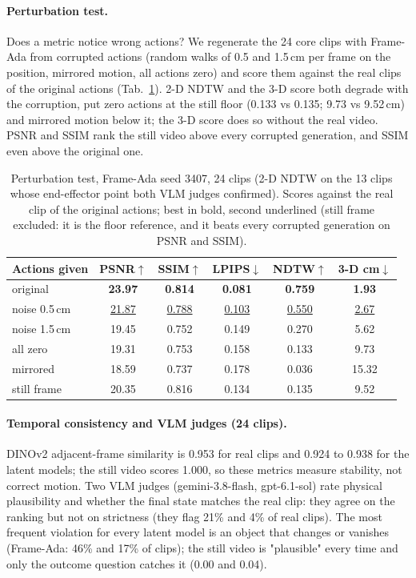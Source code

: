 \paragraph{Perturbation test.}
Does a metric notice wrong actions? We regenerate the 24 core clips with Frame-Ada from corrupted actions (random walks of 0.5 and 1.5\,cm per frame on the position, mirrored motion, all actions zero) and score them against the real clips of the original actions (Tab.~\ref{tab:perturb}).
2-D NDTW and the 3-D score both degrade with the corruption, put zero actions at the still floor (0.133 vs 0.135; 9.73 vs 9.52\,cm) and mirrored motion below it; the 3-D score does so without the real video.
PSNR and SSIM rank the still video above every corrupted generation, and SSIM even above the original one.

\begin{table}[t]
\centering
\footnotesize
\setlength{\tabcolsep}{3pt}
\begin{tabular}{@{}lccccc@{}}
\toprule
Actions given & PSNR$\uparrow$ & SSIM$\uparrow$ & LPIPS$\downarrow$ & NDTW$\uparrow$ & 3-D cm$\downarrow$ \\
\midrule
original & \textbf{23.97} & \textbf{0.814} & \textbf{0.081} & \textbf{0.759} & \textbf{1.93} \\
noise 0.5\,cm & \ul{21.87} & \ul{0.788} & \ul{0.103} & \ul{0.550} & \ul{2.67} \\
noise 1.5\,cm & 19.45 & 0.752 & 0.149 & 0.270 & 5.62 \\
all zero & 19.31 & 0.753 & 0.158 & 0.133 & 9.73 \\
mirrored & 18.59 & 0.737 & 0.178 & 0.036 & 15.32 \\
\midrule
still frame & 20.35 & 0.816 & 0.134 & 0.135 & 9.52 \\
\bottomrule
\end{tabular}
\caption{Perturbation test, Frame-Ada seed 3407, 24 clips (2-D NDTW on the 13 clips whose end-effector point both VLM judges confirmed). Scores against the real clip of the original actions; best in bold, second underlined (still frame excluded: it is the floor reference, and it beats every corrupted generation on PSNR and SSIM).}
\label{tab:perturb}
\end{table}

\paragraph{Temporal consistency and VLM judges (24 clips).}
DINOv2 adjacent-frame similarity is 0.953 for real clips and 0.924 to 0.938 for the latent models; the still video scores 1.000, so these metrics measure stability, not correct motion.
Two VLM judges (gemini-3.8-flash, gpt-6.1-sol) rate physical plausibility and whether the final state matches the real clip: they agree on the ranking but not on strictness (they flag 21\% and 4\% of real clips).
The most frequent violation for every latent model is an object that changes or vanishes (Frame-Ada: 46\% and 17\% of clips); the still video is "plausible" every time and only the outcome question catches it (0.00 and 0.04).

